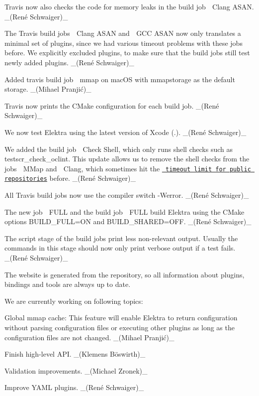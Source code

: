 \begin{DoxyItemize}
\item Travis now also checks the code for memory leaks in the build job {\ttfamily 🍏 Clang A\+S\+AN}. \+\_\+(René Schwaiger)\+\_\+
\item The Travis build jobs {\ttfamily 🍏 Clang A\+S\+AN} and {\ttfamily 🐧 G\+CC A\+S\+AN} now only translates a minimal set of plugins, since we had various timeout problems with these jobs before. We explicitly excluded plugins, to make sure that the build jobs still test newly added plugins. \+\_\+(René Schwaiger)\+\_\+
\item Added travis build job {\ttfamily 🍏 mmap} on mac\+OS with {\ttfamily mmapstorage} as the default storage. \+\_\+(Mihael Pranjić)\+\_\+
\item Travis now prints the C\+Make configuration for each build job. \+\_\+(René Schwaiger)\+\_\+
\item We now test Elektra using the latest version of Xcode ({.}). \+\_\+(René Schwaiger)\+\_\+
\item We added the build job {\ttfamily 🍏 Check Shell}, which only runs shell checks such as {\ttfamily testscr\+\_\+check\+\_\+oclint}. This update allows us to remove the shell checks from the jobs {\ttfamily 🍏 M\+Map} and {\ttfamily 🍏 Clang}, which sometimes hit the \href{https://docs.travis-ci.com/user/customizing-the-build\#build-timeouts}{\texttt{ timeout limit for public repositories}} before. \+\_\+(René Schwaiger)\+\_\+
\item All Travis build jobs now use the compiler switch {\ttfamily -\/Werror}. \+\_\+(René Schwaiger)\+\_\+
\item The new job {\ttfamily 🍏 F\+U\+LL} and the build job {\ttfamily 🐧 F\+U\+LL} build Elektra using the C\+Make options {\ttfamily B\+U\+I\+L\+D\+\_\+\+F\+U\+LL=ON} and {\ttfamily B\+U\+I\+L\+D\+\_\+\+S\+H\+A\+R\+ED=O\+FF}. \+\_\+(René Schwaiger)\+\_\+
\item The {\ttfamily script} stage of the build jobs print less non-\/relevant output. Usually the commands in this stage should now only print verbose output if a test fails. \+\_\+(René Schwaiger)\+\_\+
\end{DoxyItemize}

The website is generated from the repository, so all information about plugins, bindings and tools are always up to date.

We are currently working on following topics\+:


\begin{DoxyItemize}
\item Global mmap cache\+: This feature will enable Elektra to return configuration without parsing configuration files or executing other plugins as long as the configuration files are not changed. \+\_\+(Mihael Pranjić)\+\_\+
\item Finish high-\/level A\+PI. \+\_\+(Klemens Böswirth)\+\_\+
\item Validation improvements. \+\_\+(\+Michael Zronek)\+\_\+
\item Improve Y\+A\+ML plugins. \+\_\+(René Schwaiger)\+\_\+
\end{DoxyItemize}

